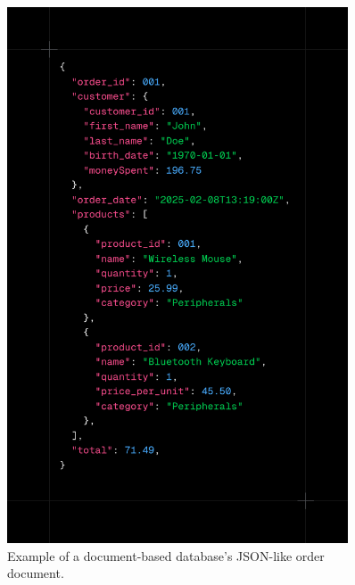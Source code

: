 \begin{figure}[htbp]
	\centering
	\includegraphics[width=0.9\textwidth, height=0.5\textheight, keepaspectratio]{Chapters/Figures/Databases/NoSQL.png}
	\caption{Example of a document-based database's \gls{JSON}-like order document.}
	\label{fig:databases:NoSQL}
\end{figure}


